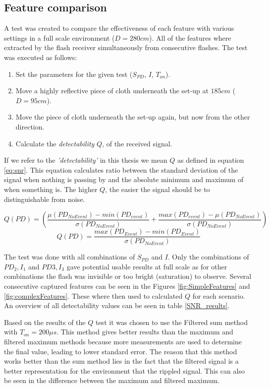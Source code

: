 \subsection{Feature comparison}
A test was created to compare the effectiveness of each feature with various settings in a full scale environment ($D = 280cm$). All of the features where extracted by the flash receiver simultaneously from consecutive flashes. The test was executed as follows:
\begin{enumerate}[itemsep=-1ex]
	\item Set the parameters for the given test ($S_{PD}$, $I$, $T_{on}$).
	\item Move a highly reflective piece of cloth underneath the set-up at $185cm$ ($D = 95cm$).
	\item Move the piece of cloth underneath the set-up again, but now from the other direction.
	\item Calculate the \textit{detectability} $Q$, of the received signal.
\end{enumerate}
If we refer to the \textit{'detectability'} in this thesis we mean $Q$ as defined in equation \ref{eq:snr}. This equation calculates ratio between the standard deviation of the signal when nothing is passing by and the absolute minimum and maximum of when something is. The higher $Q$, the easier the signal should be to distinguishable from noise.

\begin{equation}
Q(PD) = \left(\frac{\mu(PD_{NoEvent}) - min(PD_{event})}{\sigma(PD_{NoEvent})} + \frac{ max(PD_{event}) - \mu(PD_{NoEvent})}{\sigma(PD_{NoEvent})}\right)
\end{equation}
\begin{equation}
\label{eq:snr}
Q(PD) = \frac{max(PD_{Event}) - min(PD_{Event})}{\sigma(PD_{NoEvent})} 
\end{equation}

The test was done with all combinations of $S_{PD}$ and $I$. Only the combinations of $PD_2, I_{1}$ and $PD3, I_{3}$ gave potential usable results at full scale as for other combinations the flash was invisible or too bright (saturation) to observe. Several consecutive captured features can be seen in the Figures \ref{fig:SimpleFeatures} and \ref{fig:complexFeatures}. These where then used to calculated $Q$ for each scenario. An overview of all detectability values can be seen in table \ref{SNR_results}.

Based on the results of the $Q$ test it was chosen to use the Filtered sum method with $T_{on} = 200\mu s$. This method gives better results than the maximum and filtered maximum methods because more measurements are used to determine the final value, leading to lower standard error. The reason that this method works better than the sum method lies in the fact that the filtered signal is a better representation for the environment that the rippled signal. This can also be seen in the difference between the maximum and filtered maximum.

